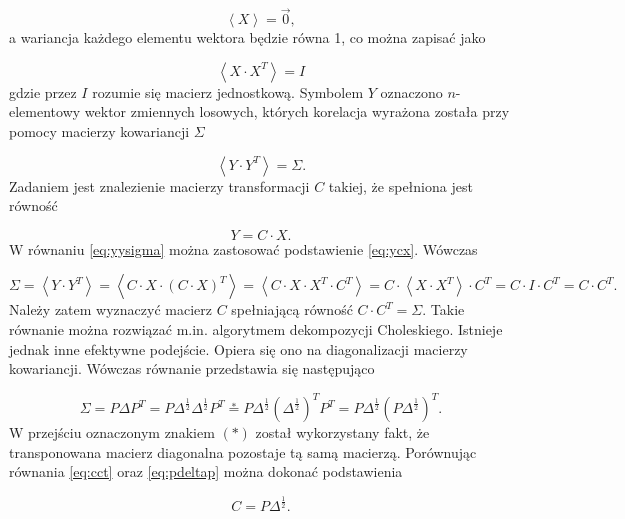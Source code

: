 \documentclass[12pt,titlepage]{article}
\numberwithin{equation}{section}
\begin{document}
\begin{equation}
\left \langle X \right \rangle = \vec{0},
\end{equation} 
a wariancja każdego elementu wektora będzie równa 1, co można zapisać jako


\begin{equation}
\left \langle X \cdot X^T \right \rangle = I
\end{equation} 
gdzie przez $I$ rozumie się macierz jednostkową. Symbolem $Y$ oznaczono $n$-elementowy wektor zmiennych losowych, których korelacja wyrażona została przy pomocy macierzy kowariancji $\Sigma$


\begin{equation}\label{eq:yysigma}
\left \langle Y \cdot Y^T \right \rangle = \Sigma.
\end{equation} 
Zadaniem jest znalezienie macierzy transformacji $C$ takiej, że spełniona jest równość

\begin{equation}\label{eq:ycx}
Y=C \cdot X.
\end{equation} 
W równaniu \eqref{eq:yysigma} można zastosować podstawienie \eqref{eq:ycx}. Wówczas

\begin{equation}\label{eq:cct}
\Sigma = \left \langle Y \cdot Y^T \right \rangle = \left \langle C \cdot X \cdot (C \cdot X)^T \right \rangle =
\left \langle C \cdot X \cdot X^T \cdot C^T \right \rangle =  C \cdot \left \langle X \cdot X^T \right \rangle \cdot C^T =
C \cdot I \cdot C^T = C \cdot C^T.
\end{equation} 
Należy zatem wyznaczyć macierz $C$ spełniającą równość $C \cdot C^T = \Sigma$. Takie równanie można rozwiązać m.in. algorytmem dekompozycji Choleskiego. Istnieje jednak inne efektywne podejście. Opiera się ono na diagonalizacji macierzy kowariancji. Wówczas równanie przedstawia się następująco 

\begin{equation}\label{eq:pdeltap}
\Sigma=P\Delta P^T=P \Delta^{\frac{1}{2}} \Delta^{\frac{1}{2}} P^T \stackrel{*}{=}
P   \Delta^{\frac{1}{2}}  (\Delta^{\frac{1}{2}})^T   P^T =
P   \Delta^{\frac{1}{2}}  ( P   \Delta^{\frac{1}{2}} )^T.
\end{equation} 
W przejściu oznaczonym znakiem $(*)$ został wykorzystany fakt, że transponowana macierz diagonalna pozostaje tą samą macierzą. Porównując równania \eqref{eq:cct} oraz \eqref{eq:pdeltap} można dokonać podstawienia


\begin{equation}\label{eq:cpdeltafrac}
C  =P  \Delta^{\frac{1}{2}}.
\end{equation} 
\end{document}
